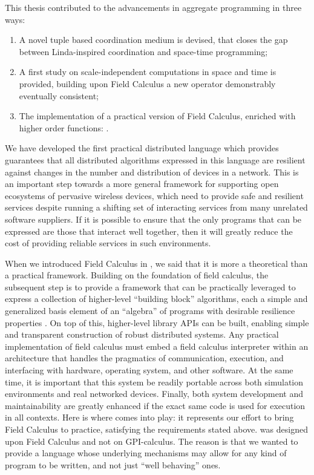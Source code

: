 \documentclass[12pt,a4paper,twoside,openright]{book}
\begin{document}
This thesis contributed to the advancements in aggregate programming in three ways:
\begin{enumerate}
 \item A novel tuple based coordination medium is devised, that closes the gap between Linda-inspired coordination and space-time programming;
 \item A first study on scale-independent computations in space and time is provided, building upon Field Calculus a new operator demonstrably eventually consistent;
 \item The implementation of a practical version of Field Calculus, enriched with higher order functions: \protelis{}.
\end{enumerate}

We have developed the first practical distributed language which provides guarantees that all distributed algorithms expressed in this language are resilient against changes in the number and distribution of devices in a network.
%
This is an important step towards a more general framework for supporting open ecosystems of pervasive wireless devices, which need to provide safe and resilient services despite running a shifting set of interacting services from many unrelated software suppliers.
%
If it is possible to ensure that the only programs that can be expressed are those that interact well together, then it will greatly reduce the cost of providing reliable services in such environments.

When we introduced Field Calculus in , we said that it is more a theoretical than a practical framework.
%
Building on the foundation of field calculus, the subsequent step is to provide a framework that can be practically leveraged to express a collection of higher-level ``building block'' algorithms, each a simple and generalized basis element of an ``algebra'' of programs with desirable resilience properties \cite{BV-FOCAS2014}.
%
On top of this, higher-level library APIs can be built, enabling simple and transparent construction of robust distributed systems.
%
Any practical implementation of field calculus must embed a field calculus interpreter within an architecture that handles the pragmatics of communication, execution, and interfacing with hardware, operating system, and other software.
%
At the same time, it is important that this system be readily portable across both simulation environments and real networked devices.
%
Finally, both system development and maintainability are greatly enhanced if the exact same code is used for execution in all contexts.
%
Here is where \protelis{} comes into play: it represents our effort to bring Field Calculus to practice, satisfying the requirements stated above.
%
\protelis{} was designed upon Field Calculus and not on GPI-calculus.
%
The reason is that we wanted to provide a language whose underlying mechanisms may allow for any kind of program to be written, and not just ``well behaving'' ones.
\end{document}
